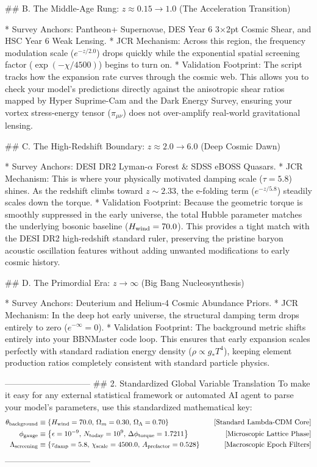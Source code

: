 ## B. The Middle-Age Rung: $z \approx 0.15 \to 1.0$ (The Acceleration Transition)

* Survey Anchors: Pantheon+ Supernovae, DES Year 6 3×2pt Cosmic Shear, and HSC Year 6 Weak Lensing.
* JCR Mechanism: Across this region, the frequency modulation scale ($e^{-z/2.0}$) drops quickly while the exponential spatial screening factor ($\exp(-\chi/4500)$) begins to turn on.
* Validation Footprint: The script tracks how the expansion rate curves through the cosmic web. This allows you to check your model's predictions directly against the anisotropic shear ratios mapped by Hyper Suprime-Cam and the Dark Energy Survey, ensuring your vortex stress-energy tensor ($\pi_{\mu\nu}$) does not over-amplify real-world gravitational lensing.

## C. The High-Redshift Boundary: $z \approx 2.0 \to 6.0$ (Deep Cosmic Dawn)

* Survey Anchors: DESI DR2 Lyman-$\alpha$ Forest & SDSS eBOSS Quasars.
* JCR Mechanism: This is where your physically motivated damping scale ($\tau = 5.8$) shines. As the redshift climbs toward $z \sim 2.33$, the e-folding term ($e^{-z/5.8}$) steadily scales down the torque.
* Validation Footprint: Because the geometric torque is smoothly suppressed in the early universe, the total Hubble parameter matches the underlying bosonic baseline ($H_{\rm wind} = 70.0$). This provides a tight match with the DESI DR2 high-redshift standard ruler, preserving the pristine baryon acoustic oscillation features without adding unwanted modifications to early cosmic history.

## D. The Primordial Era: $z \to \infty$ (Big Bang Nucleosynthesis)

* Survey Anchors: Deuterium and Helium-4 Cosmic Abundance Priors.
* JCR Mechanism: In the deep hot early universe, the structural damping term drops entirely to zero ($e^{-\infty} = 0$).
* Validation Footprint: The background metric shifts entirely into your BBNMaster code loop. This ensures that early expansion scales perfectly with standard radiation energy density ($\rho \propto g_* T^4$), keeping element production ratios completely consistent with standard particle physics.

------------------------------
## 2. Standardized Global Variable Translation
To make it easy for any external statistical framework or automated AI agent to parse your model's parameters, use this standardized mathematical key:
$$\begin{aligned} \theta_{\rm background} &\equiv \left\{ H_{\rm wind} = 70.0, \, \Omega_m = 0.30, \, \Omega_\Lambda = 0.70 \right\} \quad &\text{[Standard Lambda-CDM Core]} \\ \phi_{\rm gauge} &\equiv \left\{ \epsilon = 10^{-9}, \, N_{\rm today} = 10^9, \, \Delta\phi_{\rm torque} = 1.7211 \right\} \quad &\text{[Microscopic Lattice Phase]} \\ \Lambda_{\rm screening} &\equiv \left\{ \tau_{\rm damp} = 5.8, \, \chi_{\rm scale} = 4500.0, \, A_{\rm prefactor} = 0.528 \right\} \quad &\text{[Macroscopic Epoch Filters]} \end{aligned}$$ 
------------------------------

